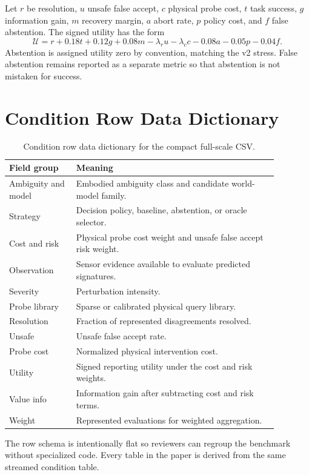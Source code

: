 \documentclass{article}
\newcommand{\utility}{\mathcal{U}}
\begin{document}
Let $r$ be resolution, $u$ unsafe false accept, $c$ physical probe cost, $t$ task success, $g$ information gain, $m$ recovery margin, $a$ abort rate, $p$ policy cost, and $f$ false abstention. The signed utility has the form
\[
\utility = r + 0.18t + 0.12g + 0.08m
- \lambda_r u - \lambda_c c - 0.08a - 0.05p - 0.04f.
\]
Abstention is assigned utility zero by convention, matching the v2 stress. False abstention remains reported as a separate metric so that abstention is not mistaken for success.

\section{Condition Row Data Dictionary}

\begin{table}[t]
\centering
\small
\begin{tabular}{p{0.22\linewidth}p{0.66\linewidth}}
\toprule
Field group & Meaning \\
\midrule
Ambiguity and model & Embodied ambiguity class and candidate world-model family. \\
Strategy & Decision policy, baseline, abstention, or oracle selector. \\
Cost and risk & Physical probe cost weight and unsafe false accept risk weight. \\
Observation & Sensor evidence available to evaluate predicted signatures. \\
Severity & Perturbation intensity. \\
Probe library & Sparse or calibrated physical query library. \\
Resolution & Fraction of represented disagreements resolved. \\
Unsafe & Unsafe false accept rate. \\
Probe cost & Normalized physical intervention cost. \\
Utility & Signed reporting utility under the cost and risk weights. \\
Value info & Information gain after subtracting cost and risk terms. \\
Weight & Represented evaluations for weighted aggregation. \\
\bottomrule
\end{tabular}
\caption{Condition row data dictionary for the compact full-scale CSV.}
\label{tab:dictionary}
\end{table}

The row schema is intentionally flat so reviewers can regroup the benchmark without specialized code. Every table in the paper is derived from the same streamed condition table.
\end{document}
